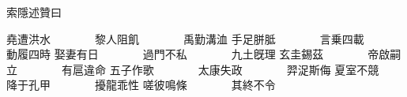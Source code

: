 索隱述贊曰

\startshuzan
堯遭洪水　　　　黎人阻飢　　　　禹勤溝洫
手足胼胝　　　　言乗四載　　　　動履四時
娶妻有日　　　　過門不私　　　　九土旣理
玄圭錫茲　　　　帝啟嗣立　　　　有扈違命
五子作歌　　　　太康失政　　　　羿浞斯侮
夏室不競　　　　降于孔甲　　　　擾龍乖性
嗟彼鳴條　　　　其終不令
\stopshuzan
